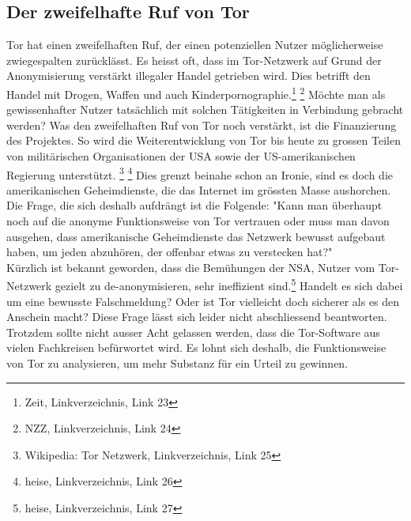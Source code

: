 \subsection{Der zweifelhafte Ruf von Tor}
Tor hat einen zweifelhaften Ruf, der einen potenziellen Nutzer möglicherweise zwiegespalten zurücklässt.
Es heisst oft, dass im Tor-Netzwerk auf Grund der Anonymisierung verstärkt illegaler Handel getrieben wird.
Dies betrifft den Handel mit Drogen, Waffen und auch Kinderpornographie.\footnote{Zeit, Linkverzeichnis, Link 23} \footnote{NZZ, Linkverzeichnis, Link 24}
Möchte man als gewissenhafter Nutzer tatsächlich mit solchen Tätigkeiten in Verbindung gebracht werden?
Was den zweifelhaften Ruf von Tor noch verstärkt, ist die Finanzierung des Projektes.
So wird die Weiterentwicklung von Tor bis heute zu grossen Teilen von militärischen Organisationen der USA sowie der US-amerikanischen Regierung  unterstützt.
\footnote{Wikipedia: Tor Netzwerk, Linkverzeichnis, Link 25}
\footnote{heise, Linkverzeichnis, Link 26}
Dies grenzt beinahe schon an Ironie, sind es doch die amerikanischen Geheimdienste, die das Internet im grössten Masse aushorchen. Die Frage, die sich deshalb aufdrängt ist die Folgende: "Kann man überhaupt noch auf die anonyme Funktionsweise von Tor vertrauen oder muss man davon ausgehen, dass amerikanische Geheimdienste das Netzwerk bewusst aufgebaut haben, um jeden abzuhören, der offenbar etwas zu verstecken hat?"
\\
Kürzlich ist bekannt geworden, dass die Bemühungen der NSA, Nutzer vom Tor-Netzwerk gezielt zu de-anonymisieren, sehr ineffizient sind.\footnote{heise, Linkverzeichnis, Link 27}
Handelt es sich dabei um eine bewusste Falschmeldung? Oder ist Tor vielleicht doch sicherer als es den Anschein macht? Diese Frage lässt sich leider nicht abschliessend beantworten. Trotzdem sollte nicht ausser Acht gelassen werden, dass die Tor-Software aus vielen Fachkreisen befürwortet wird. Es lohnt sich deshalb, die Funktionsweise von Tor zu analysieren, um mehr Substanz für ein Urteil zu gewinnen.

